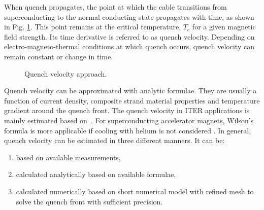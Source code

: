 
When quench propagates, the point at which the cable transitions from superconducting to the normal conducting state propagates with time, as shown in Fig. \ref{fig:quench_front_propagation_illustration}. This point remains at the critical temperature, $T_\text{c}$ for a given magnetic field strength. Its time derivative is referred to as quench velocity. Depending on electro-magneto-thermal conditions at which quench occurs, quench velocity can remain constant or change in time. 

\begin{figure}[H]
\centering
{}
\caption{Quench velocity approach.}
\label{fig:quench_front_propagation_illustration}
\end{figure}

Quench velocity can be approximated with analytic formulae. They are usually a function of current density, composite strand material properties and temperature gradient around the quench front. The quench velocity in ITER applications is mainly estimated based on~\cite{MIT_phd_thesis}. For superconducting accelerator magnets, Wilson's formula is more applicable if cooling with helium is not considered \cite[p.~206]{wilson1987superconducting}. In general, quench velocity can be estimated in three different manners. It can be:
\begin{enumerate}
\item based on available measurements,
\item calculated analytically based on available formulae,
\item calculated numerically based on short numerical model with refined mesh to solve the quench front with sufficient precision.
\end{enumerate}